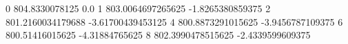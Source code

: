 0 804.8330078125 0.0
1 803.0064697265625 -1.8265380859375
2 801.2160034179688 -3.61700439453125
4 800.8873291015625 -3.9456787109375
6 800.51416015625 -4.31884765625
8 802.3990478515625 -2.4339599609375
